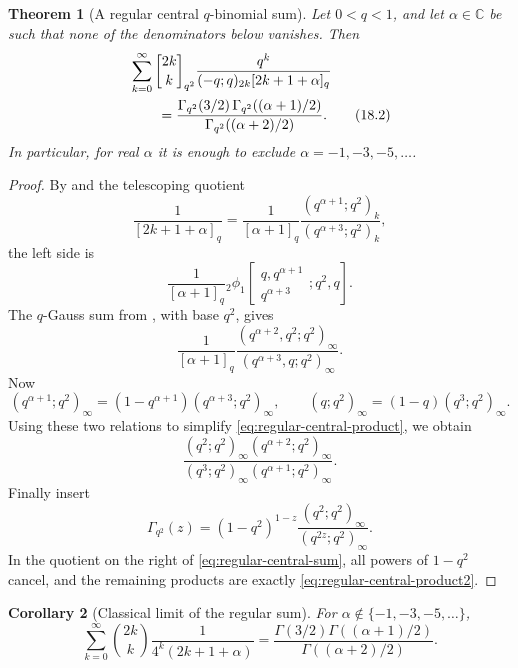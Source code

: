 \documentclass[11pt,oneside,openany]{book}
\newtheorem{theorem}{Theorem}[chapter]
\newtheorem{corollary}[theorem]{Corollary}
\theoremstyle{definition}
\theoremstyle{remark}
\newcommand{\Qbinom}[3]{\genfrac{[}{]}{0pt}{}{#1}{#2}_{#3}}
\newcommand{\C}{\mathbb C}
\begin{document}
\begin{theorem}[A regular central $q$-binomial sum]\label{thm:regular-central-sum}
Let $0<q<1$, and let $\alpha\in\C$ be such that none of the denominators below vanishes.  Then
\begin{align}
 &\sum_{k=0}^{\infty}
 \Qbinom{2k}{k}{q^2}
 \frac{q^k}{(-q;q)_{2k}[2k+1+\alpha]_q}
 \notag\\
 &\qquad=
 \frac{\Gamma_{q^2}(3/2)\,
       \Gamma_{q^2}((\alpha+1)/2)}
      {\Gamma_{q^2}((\alpha+2)/2)}.
 \tag{18.2}\label{eq:regular-central-sum}
\end{align}
In particular, for real $\alpha$ it is enough to exclude
$\alpha=-1,-3,-5,\ldots$.
\end{theorem}

\begin{proof}
By  and the telescoping quotient
\[
 \frac1{[2k+1+\alpha]_q}
 =\frac1{[\alpha+1]_q}
   \frac{(q^{\alpha+1};q^2)_k}
        {(q^{\alpha+3};q^2)_k},
\]
the left side is
\[
 \frac1{[\alpha+1]_q}
 {}_2\phi_1\!\left[
 \begin{matrix}q,q^{\alpha+1}\\q^{\alpha+3}\end{matrix};
 q^2,q\right].
\]
The $q$-Gauss sum from , with base $q^2$, gives
\[
 \frac1{[\alpha+1]_q}
 \frac{(q^{\alpha+2},q^2;q^2)_\infty}
      {(q^{\alpha+3},q;q^2)_\infty}.
 \tag{18.3}\label{eq:regular-central-product}
\]
Now
\[
 (q^{\alpha+1};q^2)_\infty
 =(1-q^{\alpha+1})(q^{\alpha+3};q^2)_\infty,
 \qquad
 (q;q^2)_\infty=(1-q)(q^3;q^2)_\infty.
\]
Using these two relations to simplify \eqref{eq:regular-central-product}, we obtain
\[
 \frac{(q^2;q^2)_\infty(q^{\alpha+2};q^2)_\infty}
 {(q^3;q^2)_\infty(q^{\alpha+1};q^2)_\infty}.
 \tag{18.4}\label{eq:regular-central-product2}
\]
Finally insert
\[
 \Gamma_{q^2}(z)
 =(1-q^2)^{1-z}
 \frac{(q^2;q^2)_\infty}{(q^{2z};q^2)_\infty}.
\]
In the quotient on the right of \eqref{eq:regular-central-sum}, all powers of $1-q^2$ cancel, and the remaining products are exactly \eqref{eq:regular-central-product2}.
\end{proof}

\begin{corollary}[Classical limit of the regular sum]\label{cor:regular-central-classical}
For $\alpha\notin\{-1,-3,-5,\ldots\}$,
\[
 \sum_{k=0}^{\infty}\binom{2k}{k}
 \frac1{4^k(2k+1+\alpha)}
 =\frac{\Gamma(3/2)\Gamma((\alpha+1)/2)}
        {\Gamma((\alpha+2)/2)}.
 \tag{18.5}\label{eq:regular-central-classical}
\]
\end{corollary}
\end{document}
